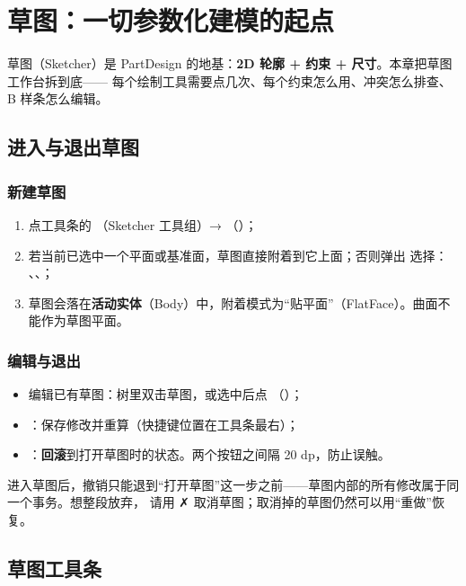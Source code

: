 \chapter{草图：一切参数化建模的起点}

草图（Sketcher）是 PartDesign 的地基：\textbf{2D 轮廓 + 约束 + 尺寸}。本章把草图工作台拆到底——
每个绘制工具需要点几次、每个约束怎么用、冲突怎么排查、B 样条怎么编辑。

\section{进入与退出草图}

\subsection{新建草图}

\begin{enumerate}
  \item 点工具条的 （Sketcher 工具组）→ （）；
  \item 若当前已选中一个平面或基准面，草图直接附着到它上面；否则弹出  选择：
        、、；
  \item 草图会落在\textbf{活动实体}（Body）中，附着模式为“贴平面”（FlatFace）。曲面不能作为草图平面。
\end{enumerate}

\subsection{编辑与退出}

\begin{itemize}
  \item 编辑已有草图：树里双击草图，或选中后点 （）；
  \item {}：保存修改并重算（快捷键位置在工具条最右）；
  \item {}：\textbf{回滚}到打开草图时的状态。两个按钮之间隔 20 dp，防止误触。
\end{itemize}

\begin{warn}[撤销在草图中是“封底”的]
进入草图后，撤销只能退到“打开草图”这一步之前——草图内部的所有修改属于同一个事务。想整段放弃，
请用 ✗ 取消草图；取消掉的草图仍然可以用“重做”恢复。
\end{warn}

\section{草图工具条}

